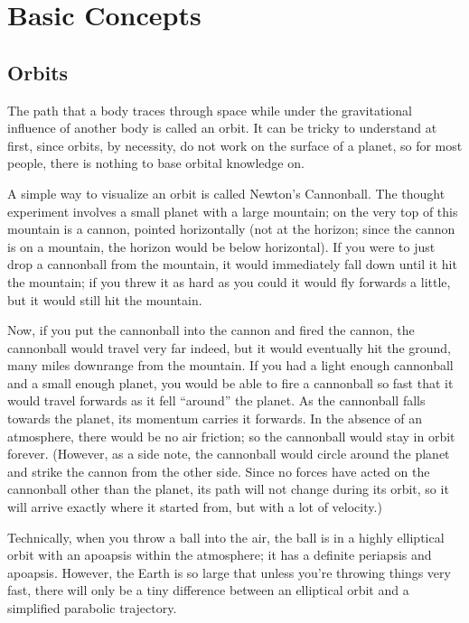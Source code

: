 \section{Basic Concepts}

\subsection{Orbits}

The path that a body traces through space while under the
gravitational influence of another body is called an orbit. It can be
tricky to understand at first, since orbits, by necessity, do not work
on the surface of a planet, so for most people, there is nothing to
base orbital knowledge on.

A simple way to visualize an orbit is called Newton's Cannonball. The
thought experiment involves a small planet with a large mountain; on
the very top of this mountain is a cannon, pointed horizontally (not
at the horizon; since the cannon is on a mountain, the horizon would
be below horizontal). If you were to just drop a cannonball from the
mountain, it would immediately fall down until it hit the mountain; if
you threw it as hard as you could it would fly forwards a little, but
it would still hit the mountain.

\begin{center}
\end{center}

\vspace{-2em}

Now, if you put the cannonball into the cannon and fired the cannon,
the cannonball would travel very far indeed, but it would eventually
hit the ground, many miles downrange from the mountain. If you had a
light enough cannonball and a small enough planet, you would be able
to fire a cannonball so fast that it would travel forwards as it fell
``around'' the planet. As the cannonball falls towards the planet, its
momentum carries it forwards. In the absence of an atmosphere, there
would be no air friction; so the cannonball would stay in orbit
forever. (However, as a side note, the cannonball would circle around
the planet and strike the cannon from the other side. Since no forces
have acted on the cannonball other than the planet, its path will not
change during its orbit, so it will arrive exactly where it started
from, but with a lot of velocity.)

Technically, when you throw a ball into the air, the ball is in a
highly elliptical orbit with an apoapsis within the atmosphere; it has
a definite periapsis and apoapsis. However, the Earth is so large that
unless you're throwing things very fast, there will only be a tiny
difference between an elliptical orbit and a simplified parabolic
trajectory.

